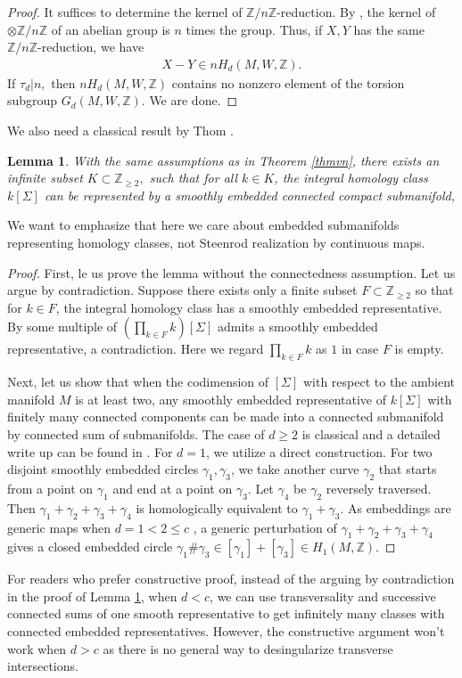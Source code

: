 \documentclass[11pt,a4paper]{amsart}
\numberwithin{equation}{section}
\newcommand{\ga}{\gamma}
\newcommand{\Si}{\Sigma}
\newcommand{\s}{\subset}
\newcommand{\ts}{\otimes}
\newcommand{\Z}{\mathbb{Z}}
\theoremstyle{plain}
\newtheorem{lem}{Lemma}[subsection]
\theoremstyle{definition}
\numberwithin{equation}{subsection}
\begin{document}
	\begin{proof}
		It suffices to determine the kernel of $\Z/n\Z$-reduction. By \cite[Section 3.2 p. 215 property (5)]{AH}, the kernel of $\ts \Z/n\Z$ of an abelian group is $n$ times the group. Thus, if $X,Y$ has the same $\Z/n\Z$-reduction, we have
		\begin{align*}
			X-Y\in nH_d(M,W,\Z).
		\end{align*}
		If $\tau_d|n,$ then $nH_d(M,W,\Z)$ contains no nonzero element of the torsion subgroup $G_d(M,W,\Z).$ We are done.
	\end{proof}
	We also need a classical result by Thom \cite{RT}.
	\begin{lem}\label{lemthom}
		With the same assumptions as in Theorem \ref{thmvn}, there exists an infinite subset $K\s \Z_{\ge 2},$ such that for all $k\in K$, the integral homology class $k[\Si]$ can be represented by a smoothly embedded connected compact submanifold,
	\end{lem}We want to emphasize that here we care about embedded submanifolds representing homology classes, not Steenrod realization by continuous maps.
	\begin{proof}
First, le us prove the lemma without the connectedness assumption. Let us argue by contradiction. Suppose there exists only a finite subset $F\s \Z_{\ge 2}$ so that for $k\in F$, the integral homology class has a smoothly embedded representative. By \cite[Theorem II.29]{RT} some multiple of $\left(\prod_{k\in F}k\right)[\Si]$ admits a smoothly embedded representative, a contradiction. Here we regard $\prod_{k\in F}k$ as $1$ in case $F$ is empty.
				
Next, let us show that when the codimension of $[\Si]$ with respect to the ambient manifold $M$ is at least two, any smoothly embedded representative of $k[\Si]$ with finitely many connected components can be made into a connected submanifold by connected sum of submanifolds. The case of $d\ge 2$ is classical \cite{CL} and a detailed write up can be found in \cite[Lemma 2.8.2]{ZLns}. For $d=1$, we utilize a direct construction. For two disjoint smoothly embedded circles $\ga_1,\ga_3$, we take another curve $\ga_2$ that starts from a point on $\ga_1$ and end at a point on $\ga_3.$ Let $\ga_4$ be $\ga_2$ reversely traversed. Then $\ga_1+\ga_2+\ga_3+\ga_4$ is homologically equivalent to $\ga_1+\ga_3$. As embeddings are generic maps when $d=1<2\le c$ \cite[2.13 Theorem, 2.6 Theorem]{MH}, a generic perturbation of $\ga_1+\ga_2+\ga_3+\ga_4$ gives a closed embedded circle $\ga_1\#\ga_3\in [\ga_1]+[\ga_3]\in H_1(M,\Z).$ 
	\end{proof}
For readers who prefer constructive proof, instead of the arguing by contradiction in the proof of Lemma \ref{lemthom}, when $d<c$, we can use transversality and successive connected sums of one smooth representative to get infinitely many classes with connected embedded representatives. However, the constructive argument won't work when $d>c$ as there is no general way to desingularize transverse intersections. 
\end{document}

